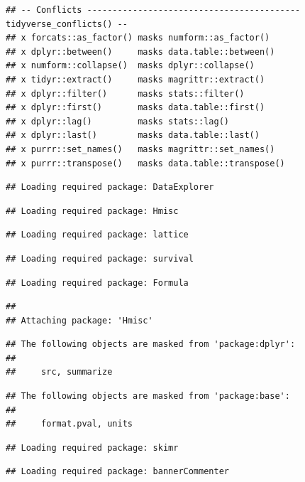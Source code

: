 \documentclass[
]{book}
\begin{document}
\begin{verbatim}
## -- Conflicts ------------------------------------------ tidyverse_conflicts() --
## x forcats::as_factor() masks numform::as_factor()
## x dplyr::between()     masks data.table::between()
## x numform::collapse()  masks dplyr::collapse()
## x tidyr::extract()     masks magrittr::extract()
## x dplyr::filter()      masks stats::filter()
## x dplyr::first()       masks data.table::first()
## x dplyr::lag()         masks stats::lag()
## x dplyr::last()        masks data.table::last()
## x purrr::set_names()   masks magrittr::set_names()
## x purrr::transpose()   masks data.table::transpose()
\end{verbatim}

\begin{verbatim}
## Loading required package: DataExplorer
\end{verbatim}

\begin{verbatim}
## Loading required package: Hmisc
\end{verbatim}

\begin{verbatim}
## Loading required package: lattice
\end{verbatim}

\begin{verbatim}
## Loading required package: survival
\end{verbatim}

\begin{verbatim}
## Loading required package: Formula
\end{verbatim}

\begin{verbatim}
## 
## Attaching package: 'Hmisc'
\end{verbatim}

\begin{verbatim}
## The following objects are masked from 'package:dplyr':
## 
##     src, summarize
\end{verbatim}

\begin{verbatim}
## The following objects are masked from 'package:base':
## 
##     format.pval, units
\end{verbatim}

\begin{verbatim}
## Loading required package: skimr
\end{verbatim}

\begin{verbatim}
## Loading required package: bannerCommenter
\end{verbatim}
\end{document}
